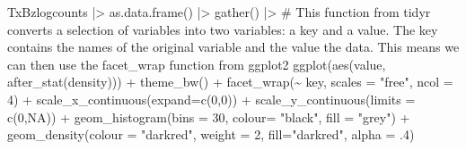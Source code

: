 \documentclass[
  letterpaper,
  DIV=11,
  numbers=noendperiod]{scrreprt}
\newenvironment{Shaded}{\begin{snugshade}}{\end{snugshade}}
\newcommand{\AttributeTok}[1]{\textcolor[rgb]{0.40,0.45,0.13}{#1}}
\newcommand{\CommentTok}[1]{\textcolor[rgb]{0.37,0.37,0.37}{#1}}
\newcommand{\ConstantTok}[1]{\textcolor[rgb]{0.56,0.35,0.01}{#1}}
\newcommand{\DecValTok}[1]{\textcolor[rgb]{0.68,0.00,0.00}{#1}}
\newcommand{\FunctionTok}[1]{\textcolor[rgb]{0.28,0.35,0.67}{#1}}
\newcommand{\NormalTok}[1]{\textcolor[rgb]{0.00,0.23,0.31}{#1}}
\newcommand{\SpecialCharTok}[1]{\textcolor[rgb]{0.37,0.37,0.37}{#1}}
\newcommand{\StringTok}[1]{\textcolor[rgb]{0.13,0.47,0.30}{#1}}
\begin{document}
\begin{Shaded}
\begin{Highlighting}[]
\NormalTok{TxBzlogcounts }\SpecialCharTok{|\textgreater{}} 
  \FunctionTok{as.data.frame}\NormalTok{() }\SpecialCharTok{|\textgreater{}}  
  \FunctionTok{gather}\NormalTok{() }\SpecialCharTok{|\textgreater{}}  \CommentTok{\# This function from tidyr converts a selection of variables into two variables: a key and a value. The key contains the names of the original variable and the value the data. This means we can then use the facet\_wrap function from ggplot2}
  \FunctionTok{ggplot}\NormalTok{(}\FunctionTok{aes}\NormalTok{(value, }\FunctionTok{after\_stat}\NormalTok{(density))) }\SpecialCharTok{+}
  \FunctionTok{theme\_bw}\NormalTok{() }\SpecialCharTok{+}
  \FunctionTok{facet\_wrap}\NormalTok{(}\SpecialCharTok{\textasciitilde{}}\NormalTok{ key, }\AttributeTok{scales =} \StringTok{"free"}\NormalTok{, }\AttributeTok{ncol =} \DecValTok{4}\NormalTok{) }\SpecialCharTok{+}
  \FunctionTok{scale\_x\_continuous}\NormalTok{(}\AttributeTok{expand=}\FunctionTok{c}\NormalTok{(}\DecValTok{0}\NormalTok{,}\DecValTok{0}\NormalTok{)) }\SpecialCharTok{+}
  \FunctionTok{scale\_y\_continuous}\NormalTok{(}\AttributeTok{limits =} \FunctionTok{c}\NormalTok{(}\DecValTok{0}\NormalTok{,}\ConstantTok{NA}\NormalTok{)) }\SpecialCharTok{+}
  \FunctionTok{geom\_histogram}\NormalTok{(}\AttributeTok{bins =} \DecValTok{30}\NormalTok{, }\AttributeTok{colour=} \StringTok{"black"}\NormalTok{, }\AttributeTok{fill =} \StringTok{"grey"}\NormalTok{) }\SpecialCharTok{+}
  \FunctionTok{geom\_density}\NormalTok{(}\AttributeTok{colour =} \StringTok{"darkred"}\NormalTok{, }\AttributeTok{weight =} \DecValTok{2}\NormalTok{, }\AttributeTok{fill=}\StringTok{"darkred"}\NormalTok{, }\AttributeTok{alpha =}\NormalTok{ .}\DecValTok{4}\NormalTok{)}
\end{Highlighting}
\end{Shaded}
\end{document}
